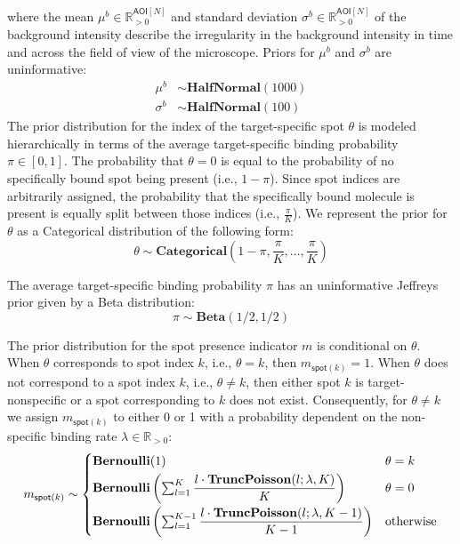 \noindent
where the mean $\mu^b \in \mathbb{R}_{>0}^{\mathsf{AOI}[N]}$ and standard deviation $\sigma^b \in \mathbb{R}_{>0}^{\mathsf{AOI}[N]}$ of the background intensity describe the irregularity in the background intensity in time and across the field of view of the microscope. Priors for $\mu^b$ and $\sigma^b$ are uninformative:
%
\begin{subequations}
\begin{align}
    \mu^b &\sim \mathbf{HalfNormal}(1000) \\
    \sigma^b &\sim \mathbf{HalfNormal}(100)
\end{align}
\end{subequations}
%
The prior distribution for the index of the target-specific spot $\theta$ is modeled hierarchically in terms of the average target-specific binding probability $\pi \in [0, 1] $. The probability that $\theta = 0$ is equal to the probability of no specifically bound spot being present (i.e., $1-\pi$). Since spot indices are arbitrarily assigned, the probability that the specifically bound molecule is present is equally split between those indices (i.e., $\frac{\pi}{K}$). We represent the prior for $\theta$ as a Categorical distribution of the following form:
%
\begin{equation}
    \theta \sim \mathbf{Categorical}\left(1 - \pi, \frac{\pi}{K}, \dots, \frac{\pi}{K}\right)
\end{equation}

The average target-specific binding probability $\pi$ has an uninformative Jeffreys prior \cite{Gelman2013-ro} given by a Beta distribution:
%
\begin{equation}
    \pi \sim \mathbf{Beta}(1/2, 1/2)
\end{equation}

The prior distribution for the spot presence indicator $m$ is conditional on $\theta$. When $\theta$ corresponds to spot index $k$, i.e., $\theta = k$, then $m_{\mathsf{spot}(k)} = 1$. When $\theta$ does not correspond to a spot index $k$, i.e., $\theta \neq k$, then either spot $k$ is target-nonspecific or a spot corresponding to $k$ does not exist. Consequently, for $\theta \neq k$ we assign $m_{\mathsf{spot}(k)}$ to either 0 or 1 with a probability dependent on the non-specific binding rate $\lambda \in \mathbb{R}_{>0}$:
%
\begin{equation}
    m_{\mathsf{spot}(k)} \sim
    \begin{cases}
        \mathbf{Bernoulli}(1) & \text{$\theta = k$} \\
        \mathbf{Bernoulli} \left( \sum_{l=1}^K \dfrac{l \cdot \mathbf{TruncPoisson}(l; \lambda, K)}{K} \right) & \text{$\theta = 0$} \rule{0pt}{4ex} \\
        \mathbf{Bernoulli} \left( \sum_{l=1}^{K-1} \dfrac{l \cdot \mathbf{TruncPoisson}(l; \lambda, K-1)}{K-1} \right) & \text{otherwise} \rule{0pt}{4ex}
    \end{cases}
\end{equation}

